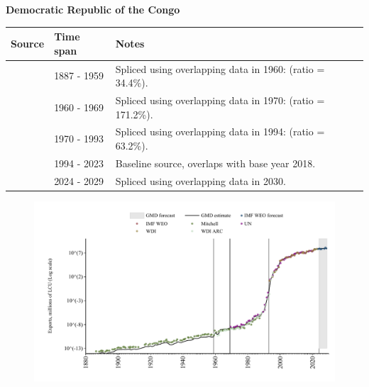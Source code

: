 \documentclass[12pt,a4paper,landscape]{article}
\begin{document}
\begin{adjustbox}{max totalsize={\paperwidth}{\paperheight},center}
\begin{minipage}[t][\textheight][t]{\textwidth}
\vspace*{0.5cm}
{}
\begin{center}
{\Large\bfseries Democratic Republic of the Congo}
\end{center}
\vspace{0.5cm}
\begin{table}[H]
\centering
\small
\begin{tabular}{|l|l|l|}
\hline
\textbf{Source} & \textbf{Time span} & \textbf{Notes} \\
\hline
\rowcolor{white}\cite{Mitchell}& 1887 - 1959 &Spliced using overlapping data in 1960: (ratio = 34.4\%).\\
\rowcolor{lightgray}\cite{WDI_ARC}& 1960 - 1969 &Spliced using overlapping data in 1970: (ratio = 171.2\%).\\
\rowcolor{white}\cite{UN}& 1970 - 1993 &Spliced using overlapping data in 1994: (ratio = 63.2\%).\\
\rowcolor{lightgray}\cite{WDI}& 1994 - 2023 &Baseline source, overlaps with base year 2018.\\
\rowcolor{white}\cite{IMF_WEO_forecast}& 2024 - 2029 &Spliced using overlapping data in 2030.\\
\hline
\end{tabular}
\end{table}
\begin{figure}[H]
\centering
\includegraphics[width=\textwidth,height=0.6\textheight,keepaspectratio]{graphs/COD_exports.pdf}
\end{figure}
\end{minipage}
\end{adjustbox}
\end{document}
